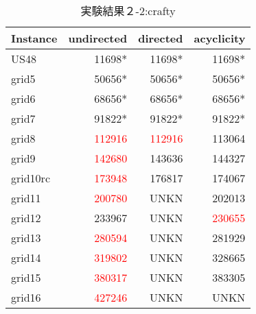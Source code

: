 \begin{table}[htbp]
  \caption{実験結果２-2:crafty}
  \label{min_table_cr}
  \centering
  \begin{tabular}{|l|rrr|}
    \hline
    Instance&undirected&directed&acyclicity \\
    \hline
US48&11698*&11698*&11698* \\
grid5&50656*&50656*&50656* \\
grid6&68656*&68656*&68656* \\
grid7&91822*&91822*&91822* \\
grid8&\textcolor{red}{112916}&\textcolor{red}{112916}&113064 \\
grid9&\textcolor{red}{142680}&143636&144327 \\
grid10rc&\textcolor{red}{173948}&176817&174067 \\
grid11&\textcolor{red}{200780}&UNKN&202013 \\
grid12&233967&UNKN&\textcolor{red}{230655} \\
grid13&\textcolor{red}{280594}&UNKN&281929 \\
grid14&\textcolor{red}{319802}&UNKN&328665 \\
grid15&\textcolor{red}{380317}&UNKN&383305 \\
grid16&\textcolor{red}{427246}&UNKN&UNKN \\
    \hline
  \end{tabular}
\end{table}
